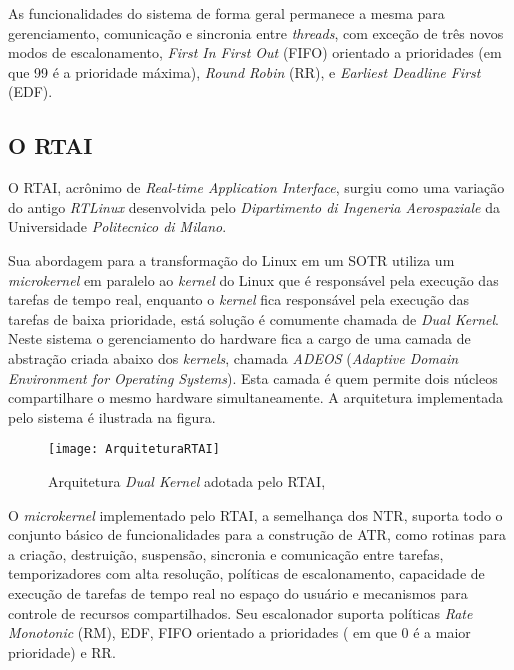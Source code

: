 As funcionalidades do sistema de forma geral permanece a mesma para gerenciamento, comunicação e sincronia entre \textit{threads}, com exceção de três novos modos de escalonamento, \textit{First In First Out} (FIFO) orientado a prioridades (em que 99 é a prioridade máxima), \textit{Round Robin} (RR), e \textit{Earliest Deadline First} (EDF).

\subsection{O RTAI}
O RTAI, acrônimo de \textit{Real-time Application Interface}, surgiu como uma variação do antigo \textit{RTLinux} desenvolvida pelo \textit{Dipartimento di Ingeneria Aerospaziale} da Universidade \textit{Politecnico di Milano}.

Sua abordagem para a transformação do Linux em um SOTR utiliza um \textit{microkernel} em paralelo ao \textit{kernel} do Linux que é responsável pela execução das tarefas de tempo real, enquanto o \textit{kernel} fica responsável pela execução das tarefas de baixa prioridade, está solução é comumente chamada de \textit{Dual Kernel}. Neste sistema o gerenciamento do hardware fica a cargo de uma camada de abstração criada abaixo dos \textit{kernels}, chamada \textit{ADEOS} (\textit{Adaptive Domain Environment for Operating Systems}). Esta camada é quem permite dois  núcleos compartilhare o mesmo hardware simultaneamente. A arquitetura implementada pelo sistema é ilustrada na figura.

\begin{figure}[!htb]
    \centering
    \texttt{[image: ArquiteturaRTAI]}
    \caption{Arquitetura \textit{Dual Kernel} adotada pelo RTAI, \cite{Litayem2011}}
    \label{TemposTarefa}
\end{figure}

O \textit{microkernel} implementado pelo RTAI, a semelhança dos NTR, suporta todo o conjunto básico de funcionalidades para a construção de ATR, como rotinas para a criação, destruição, suspensão, sincronia e comunicação entre tarefas, temporizadores com alta resolução, políticas de escalonamento, capacidade de execução de tarefas de tempo real no espaço do usuário e mecanismos para controle de recursos compartilhados. Seu escalonador suporta políticas \textit{Rate Monotonic} (RM), EDF, FIFO orientado a prioridades ( em que 0 é a maior prioridade) e RR.

